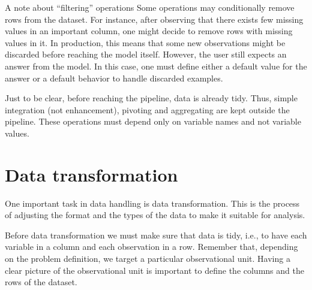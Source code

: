 \begin{hlbox}{A note about ``filtering'' operations}
  Some operations may conditionally remove rows from the dataset.  For instance, after
  observing that there exists few missing values in an important column, one might decide
  to remove rows with missing values in it.  In production, this means that some new
  observations might be discarded before reaching the model itself.  However, the user
  still expects an answer from the model.  In this case, one must define either a default
  value for the answer or a default behavior to handle discarded examples.
\end{hlbox}


Just to be clear, before reaching the pipeline, data is already tidy.  Thus, simple
integration (not enhancement), pivoting and aggregating are kept outside the pipeline.
These operations must depend only on variable names and not variable values.

\section{Data transformation}

One important task in data handling is data transformation.  This is the process of adjusting
the format and the types of the data to make it suitable for analysis.

Before data transformation we must make sure that data is tidy, i.e., to have
each variable in a column and each observation in a row.  Remember that, depending on the
problem definition, we target a particular observational unit.  Having a clear picture of
the observational unit is important to define the columns and the rows of the dataset.

